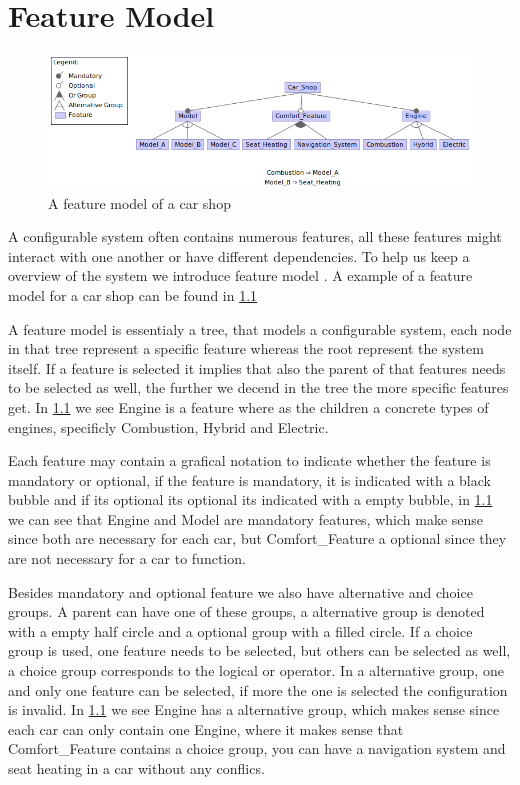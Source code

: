 \chapter{Feature Model}\label{ch:Feature Model}

\begin{figure}[h]
    \centering
    \includegraphics[scale=0.65]{gfx/Car_Shop.png}
    \caption{A feature model of a car shop}
    \label{fig:car}
\end{figure}

A configurable system often contains numerous features, all these features might interact with one another or have different dependencies.
To help us keep a overview of the system we introduce feature model \cite{Feature-Oriented-Software-Product-Lines-Feature-models}. A example
of a feature model for a car shop can be found in \ref{fig:car}

A feature model is essentialy a tree, that models a configurable system, each node in that tree represent a specific feature whereas the root
represent the system itself. If a feature is selected it implies that also the parent of that features needs to be selected as well, the further
we decend in the tree the more specific features get. In \ref{fig:car} we see Engine is a feature where as the children a concrete types
of engines, specificly Combustion, Hybrid and Electric.

Each feature may contain a grafical notation to indicate whether the feature is mandatory or optional, if the feature is mandatory, it is 
indicated with a black bubble and if its optional its optional its indicated with a empty bubble, in \ref{fig:car} we can see that Engine and
Model are mandatory features, which make sense since both are necessary for each car, but Comfort\_Feature a optional since they are not
necessary for a car to function.

Besides mandatory and optional feature we also have alternative and choice groups. A parent can have one of these groups, a alternative group
is denoted with a empty half circle and a optional group with a filled circle. If a choice group is used, one feature needs to be selected, but
others can be selected as well, a choice group corresponds to the logical or operator. In a alternative group, one and only one feature can be
selected, if more the one is selected the configuration is invalid. In \ref{fig:car} we see Engine has a alternative group, which makes sense
since each car can only contain one Engine, where it makes sense that Comfort\_Feature contains a choice group, you can have a navigation system
and seat heating in a car without any conflics.

